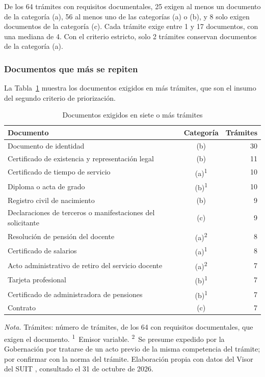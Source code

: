 De los 64 trámites con requisitos documentales, 25 exigen al menos un documento de la categoría (a), 56 al menos uno de las categorías (a) o (b), y 8 solo exigen documentos de la categoría (c). Cada trámite exige entre 1 y 17 documentos, con una mediana de 4. Con el criterio estricto, solo 2 trámites conservan documentos de la categoría (a).

\subsubsection{Documentos que más se repiten}

La Tabla~\ref{tab:repetidos} muestra los documentos exigidos en más trámites, que son el insumo del segundo criterio de priorización.

\begin{table}[htbp]
\centering
\caption{Documentos exigidos en siete o más trámites}
\label{tab:repetidos}
\begin{tabular}{p{8.5cm}cr}
\hline
Documento & Categoría & Trámites \\
\hline
Documento de identidad & (b) & 30 \\
Certificado de existencia y representación legal & (b) & 11 \\
Certificado de tiempo de servicio & (a)\textsuperscript{1} & 10 \\
Diploma o acta de grado & (b)\textsuperscript{1} & 10 \\
Registro civil de nacimiento & (b) & 9 \\
Declaraciones de terceros o manifestaciones del solicitante & (c) & 9 \\
Resolución de pensión del docente & (a)\textsuperscript{2} & 8 \\
Certificado de salarios & (a)\textsuperscript{1} & 8 \\
Acto administrativo de retiro del servicio docente & (a)\textsuperscript{2} & 7 \\
Tarjeta profesional & (b)\textsuperscript{1} & 7 \\
Certificado de administradora de pensiones & (b)\textsuperscript{1} & 7 \\
Contrato & (c) & 7 \\
\hline
\end{tabular}

\smallskip
\footnotesize\textit{Nota.} Trámites: número de trámites, de los 64 con requisitos documentales, que exigen el documento. \textsuperscript{1}~Emisor variable. \textsuperscript{2}~Se presume expedido por la Gobernación por tratarse de un acto previo de la misma competencia del trámite; por confirmar con la norma del trámite. Elaboración propia con datos del Visor del SUIT \parencite{funcionpublica2026visorsuit}, consultado el 31 de octubre de 2026.
\end{table}

